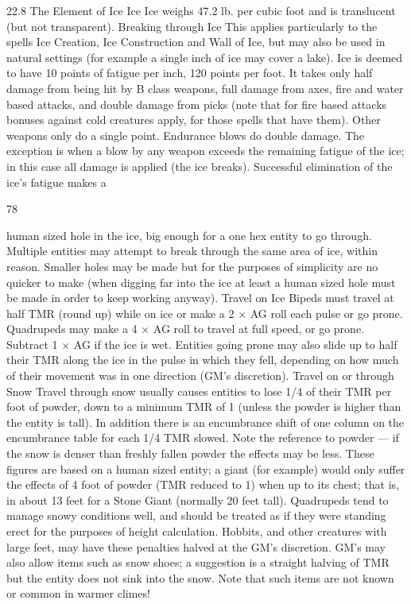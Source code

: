 \documentclass[a4paper]{article}
\begin{document}
\begin{multicols}{3}
22.8 The Element of Ice
Ice
Ice weighs 47.2 lb. per cubic foot and is translucent
(but not transparent).
Breaking through Ice
This applies particularly to the spells Ice Creation,
Ice Construction and Wall of Ice, but may also be
used in natural settings (for example a single inch
of ice may cover a lake).
Ice is deemed to have 10 points of fatigue per inch,
120 points per foot. It takes only half damage from
being hit by B class weapons, full damage from
axes, fire and water based attacks, and double
damage from picks (note that for fire based attacks
bonuses against cold creatures apply, for those
spells that have them). Other weapons only do a
single point. Endurance blows do double damage.
The exception is when a blow by any weapon
exceeds the remaining fatigue of the ice; in this
case all damage is applied (the ice breaks). Successful elimination of the ice’s fatigue makes a

78

human sized hole in the ice, big enough for a one
hex entity to go through. Multiple entities may
attempt to break through the same area of ice,
within reason. Smaller holes may be made but for
the purposes of simplicity are no quicker to make
(when digging far into the ice at least a human
sized hole must be made in order to keep working
anyway).
Travel on Ice
Bipeds must travel at half TMR (round up) while
on ice or make a 2 × AG roll each pulse or go
prone. Quadrupeds may make a 4 × AG roll to
travel at full speed, or go prone. Subtract 1 × AG if
the ice is wet. Entities going prone may also slide
up to half their TMR along the ice in the pulse in
which they fell, depending on how much of their
movement was in one direction (GM’s discretion).
Travel on or through Snow
Travel through snow usually causes entities to lose
1/4 of their TMR per foot of powder, down to a
minimum TMR of 1 (unless the powder is higher
than the entity is tall). In addition there is an encumbrance shift of one column on the encumbrance table for each 1/4 TMR slowed. Note the
reference to powder — if the snow is denser than
freshly fallen powder the effects may be less.
These figures are based on a human sized entity; a
giant (for example) would only suffer the effects of
4 foot of powder (TMR reduced to 1) when up to
its chest; that is, in about 13 feet for a Stone Giant
(normally 20 feet tall). Quadrupeds tend to manage
snowy conditions well, and should be treated as if
they were standing erect for the purposes of height
calculation. Hobbits, and other creatures with large
feet, may have these penalties halved at the GM’s
discretion. GM’s may also allow items such as
snow shoes; a suggestion is a straight halving of
TMR but the entity does not sink into the snow.
Note that such items are not known or common in
warmer climes!


\end{multicols}
\end{document}
